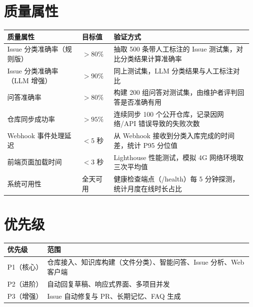\documentclass[10pt,a4paper]{article}
\newenvironment{ieeetable}{\begin{center}}{\end{center}}
\begin{document}
\section{质量属性}

\begin{ieeetable}
    \begin{tabularx}{\textwidth}{L{3.5cm} C{2.2cm} X}
        \toprule
        \textbf{质量属性} & \textbf{目标值} & \textbf{验证方式} \\
        \midrule
        Issue 分类准确率（规则版） & $> 80\%$ & 抽取 500 条带人工标注的 Issue 测试集，对比分类结果计算准确率 \\
        \midrule
        Issue 分类准确率（LLM 增强） & $> 90\%$ & 同上测试集，LLM 分类结果与人工标注对比 \\
        \midrule
        问答准确率 & $> 80\%$ & 构建 200 组问答对测试集，由维护者评判回答是否准确有用 \\
        \midrule
        仓库同步成功率 & $> 95\%$ & 连续同步 100 个公开仓库，记录因网络/API 错误导致的失败次数 \\
        \midrule
        Webhook 事件处理延迟 & $< 5$ 秒 & 从 Webhook 接收到分类入库完成的时间差，统计 P95 分位值 \\
        \midrule
        前端页面加载时间 & $< 3$ 秒 & Lighthouse 性能测试，模拟 4G 网络环境取三次平均值 \\
        \midrule
        系统可用性 & 全天可用 & 健康检查端点（/health）每 5 分钟探测，统计月度在线时长占比 \\
        \bottomrule
    \end{tabularx}
\end{ieeetable}

\section{优先级}

\begin{ieeetable}
    \begin{tabularx}{\textwidth}{C{1.8cm} X}
        \toprule
        \textbf{优先级} & \textbf{范围} \\
        \midrule
        P1（核心） & 仓库接入、知识库构建（文件分类）、智能问答、Issue 分析、Web 客户端 \\
        \midrule
        P2（进阶） & 自动回复草稿、响应式界面、多项目并发 \\
        \midrule
        P3（增强） & Issue 自动修复与 PR、长期记忆、FAQ 生成 \\
        \bottomrule
    \end{tabularx}
\end{ieeetable}
\end{document}
